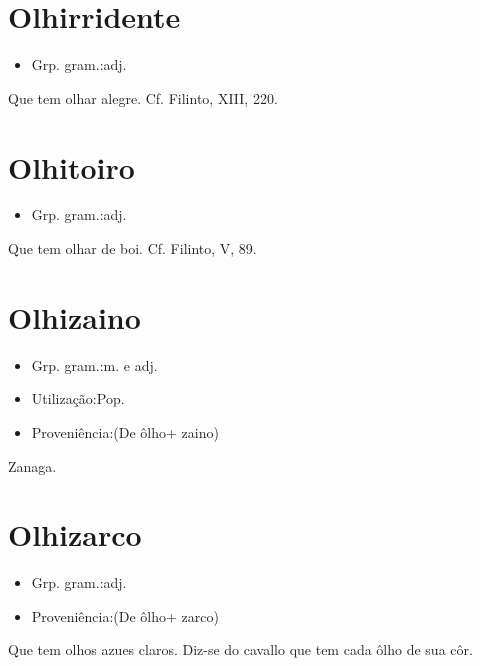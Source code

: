 \section{Olhirridente}
\begin{itemize}
\item {Grp. gram.:adj.}
\end{itemize}
Que tem olhar alegre. Cf. Filinto, XIII, 220.
\section{Olhitoiro}
\begin{itemize}
\item {Grp. gram.:adj.}
\end{itemize}
Que tem olhar de boi. Cf. Filinto, V, 89.
\section{Olhizaino}
\begin{itemize}
\item {Grp. gram.:m.  e  adj.}
\end{itemize}
\begin{itemize}
\item {Utilização:Pop.}
\end{itemize}
\begin{itemize}
\item {Proveniência:(De \textunderscore ôlho\textunderscore  + \textunderscore zaino\textunderscore )}
\end{itemize}
Zanaga.
\section{Olhizarco}
\begin{itemize}
\item {Grp. gram.:adj.}
\end{itemize}
\begin{itemize}
\item {Proveniência:(De \textunderscore ôlho\textunderscore  + \textunderscore zarco\textunderscore )}
\end{itemize}
Que tem olhos azues claros.
Diz-se do cavallo que tem cada ôlho de sua côr.
